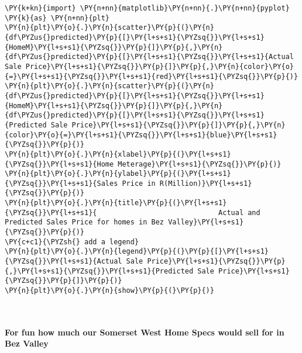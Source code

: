    \begin{tcolorbox}[breakable, size=fbox, boxrule=1pt, pad at break*=1mm,colback=cellbackground, colframe=cellborder]
\begin{Verbatim}[commandchars=\\\{\}]
\PY{k+kn}{import} \PY{n+nn}{matplotlib}\PY{n+nn}{.}\PY{n+nn}{pyplot} \PY{k}{as} \PY{n+nn}{plt}
\PY{n}{plt}\PY{o}{.}\PY{n}{scatter}\PY{p}{(}\PY{n}{df\PYZus{}predicted}\PY{p}{[}\PY{l+s+s1}{\PYZsq{}}\PY{l+s+s1}{HomeM}\PY{l+s+s1}{\PYZsq{}}\PY{p}{]}\PY{p}{,}\PY{n}{df\PYZus{}predicted}\PY{p}{[}\PY{l+s+s1}{\PYZsq{}}\PY{l+s+s1}{Actual Sale Price}\PY{l+s+s1}{\PYZsq{}}\PY{p}{]}\PY{p}{,}\PY{n}{color}\PY{o}{=}\PY{l+s+s1}{\PYZsq{}}\PY{l+s+s1}{red}\PY{l+s+s1}{\PYZsq{}}\PY{p}{)}
\PY{n}{plt}\PY{o}{.}\PY{n}{scatter}\PY{p}{(}\PY{n}{df\PYZus{}predicted}\PY{p}{[}\PY{l+s+s1}{\PYZsq{}}\PY{l+s+s1}{HomeM}\PY{l+s+s1}{\PYZsq{}}\PY{p}{]}\PY{p}{,}\PY{n}{df\PYZus{}predicted}\PY{p}{[}\PY{l+s+s1}{\PYZsq{}}\PY{l+s+s1}{Predicted Sale Price}\PY{l+s+s1}{\PYZsq{}}\PY{p}{]}\PY{p}{,}\PY{n}{color}\PY{o}{=}\PY{l+s+s1}{\PYZsq{}}\PY{l+s+s1}{blue}\PY{l+s+s1}{\PYZsq{}}\PY{p}{)}
\PY{n}{plt}\PY{o}{.}\PY{n}{xlabel}\PY{p}{(}\PY{l+s+s1}{\PYZsq{}}\PY{l+s+s1}{Home Meterage}\PY{l+s+s1}{\PYZsq{}}\PY{p}{)}
\PY{n}{plt}\PY{o}{.}\PY{n}{ylabel}\PY{p}{(}\PY{l+s+s1}{\PYZsq{}}\PY{l+s+s1}{Sales Price in R(Million)}\PY{l+s+s1}{\PYZsq{}}\PY{p}{)}
\PY{n}{plt}\PY{o}{.}\PY{n}{title}\PY{p}{(}\PY{l+s+s1}{\PYZsq{}}\PY{l+s+s1}{                             Actual and Predicted Sales Price for homes in Bez Valley}\PY{l+s+s1}{\PYZsq{}}\PY{p}{)}
\PY{c+c1}{\PYZsh{} add a legend}
\PY{n}{plt}\PY{o}{.}\PY{n}{legend}\PY{p}{(}\PY{p}{[}\PY{l+s+s1}{\PYZsq{}}\PY{l+s+s1}{Actual Sale Price}\PY{l+s+s1}{\PYZsq{}}\PY{p}{,}\PY{l+s+s1}{\PYZsq{}}\PY{l+s+s1}{Predicted Sale Price}\PY{l+s+s1}{\PYZsq{}}\PY{p}{]}\PY{p}{)}
\PY{n}{plt}\PY{o}{.}\PY{n}{show}\PY{p}{(}\PY{p}{)}
\end{Verbatim}
\end{tcolorbox}

    \begin{center}
    \end{center}
    { \hspace*{\fill} \\}
    
    \hypertarget{for-fun-how-much-our-somerset-west-home-specs-would-sell-for-in-bez-valley}{%
\paragraph{For fun how much our Somerset West Home Specs would sell for
in Bez
Valley}\label{for-fun-how-much-our-somerset-west-home-specs-would-sell-for-in-bez-valley}}

